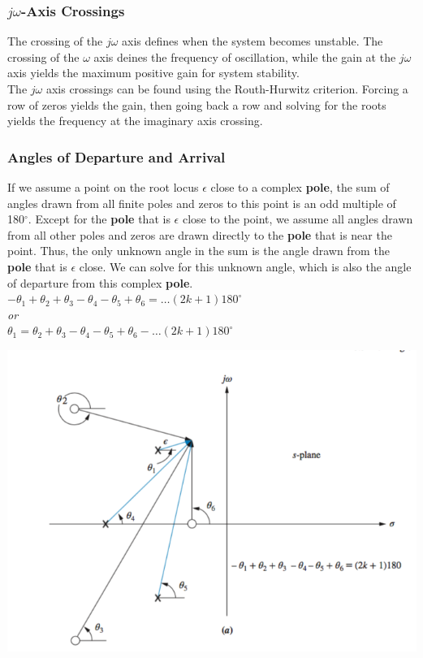 \documentclass[11pt]{article}
\begin{document}
    \subsubsection{$j\omega$-Axis Crossings}

    The crossing of the $j\omega$ axis defines when the system becomes unstable. The crossing of the $\omega$ axis deines the frequency of oscillation, while the gain at the $j\omega$ axis yields the maximum positive gain for system stability. \\ 

    The $j\omega$ axis crossings can be found using the Routh-Hurwitz criterion. Forcing a row of zeros yields the gain, then going back a row and solving for the roots yields the frequency at the imaginary axis crossing.

    \subsubsection{Angles of Departure and Arrival}

    If we assume a point on the root locus $\epsilon$ close to a complex \textbf{pole}, the sum of angles drawn from all finite poles and zeros to this point is an odd multiple of 180$^\circ$. Except for the \textbf{pole} that is $\epsilon$ close to the point, we assume all angles drawn from all other poles and zeros are drawn directly to the \textbf{pole} that is near the point. Thus, the only unknown angle in the sum is the angle drawn from the \textbf{pole} that is $\epsilon$ close. We can solve for this unknown angle, which is also the angle of departure from this complex \textbf{pole}. \\

    $-\theta_1 + \theta_2 + \theta_3 - \theta_4 - \theta_5 + \theta_6 =(2k+1)180^\circ$ \\ 
    
    \textit{or} \\ 

    $\theta_1 = \theta_2 + \theta_3 - \theta_4 - \theta_5 + \theta_6 -(2k+1)180^\circ$ \\

    \begin{center}
        \includegraphics[width=300 px]{img/angles-pole} \\
    \end{center}    
    
\end{document}
